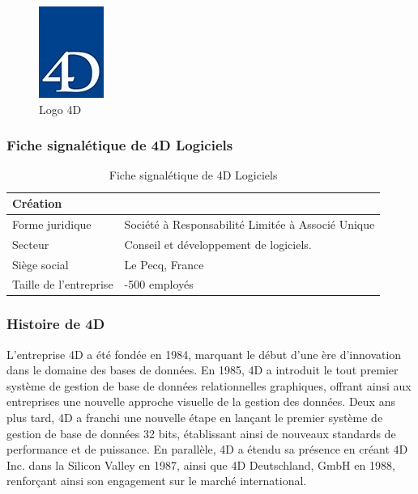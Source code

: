 \begin{figure}[h]
    \centering
    \includegraphics[scale=1]{Images/logo-4d.jpg} %
    \caption{Logo 4D}
    \label{fig:Logo4D}
\end{figure}


\subsubsection{Fiche signalétique de 4D Logiciels}


\begin{table}[h!]
    \centering
    \caption{Fiche signalétique de 4D Logiciels}
    \begin{tabular}{|>{\raggedright\arraybackslash}m{6cm}|>{\raggedright\arraybackslash}m{6cm}|}
    \hline
    Création & 1984 \\ 
    \hline
    Forme juridique & Société à Responsabilité Limitée à Associé Unique \\ 
    \hline
    Secteur & Conseil et développement de logiciels. \\ 
    \hline
    Siège social & Le Pecq, France \\ 
    \hline
    Taille de l’entreprise & 200-500 employés \\ 
    \hline
    \end{tabular}
    \label{tab:fiche_signaletique}
\end{table}


\subsubsection{Histoire de 4D}
L’entreprise 4D a été fondée en 1984, marquant le début d’une ère d’innovation dans le
domaine des bases de données. En 1985, 4D a introduit le tout premier système de gestion
de base de données relationnelles graphiques, offrant ainsi aux entreprises une nouvelle
approche visuelle de la gestion des données. Deux ans plus tard, 4D a franchi une nouvelle
étape en lançant le premier système de gestion de base de données 32 bits, établissant
ainsi de nouveaux standards de performance et de puissance. En parallèle, 4D a étendu
sa présence en créant 4D Inc. dans la Silicon Valley en 1987, ainsi que 4D Deutschland,
GmbH en 1988, renforçant ainsi son engagement sur le marché international.


